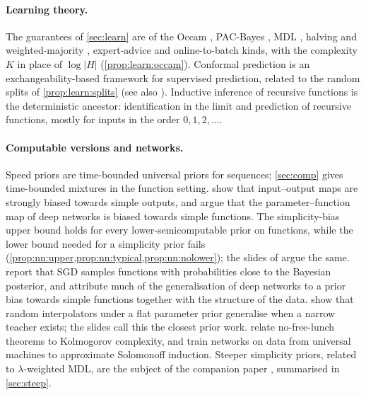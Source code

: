 \paragraph{Learning theory.} The guarantees of \cref{sec:learn} are of the Occam \citep{blumer1987occam}, PAC-Bayes \citep{mcallester1999some}, MDL \citep{barron1991minimum,grunwald2007minimum}, halving and weighted-majority \citep{littlestone1988learning,littlestone1994weighted}, expert-advice \citep{vovk1990aggregating,cesabianchi2006prediction} and online-to-batch \citep{littlestone1989online,cesabianchi2004generalization} kinds, with the complexity $K$ in place of $\log|H|$ (\cref{prop:learn:occam}). Conformal prediction \citep{vovk2005algorithmic} is an exchangeability-based framework for supervised prediction, related to the random splits of \cref{prop:learn:splits} (see also \citealp{vovk1992universal}). Inductive inference of recursive functions \citep{gold1967language,barzdin1972prediction,case1983comparison} is the deterministic ancestor: identification in the limit and prediction of recursive functions, mostly for inputs in the order $0,1,2,\dots$.

\paragraph{Computable versions and networks.}\label{rem:nn:literature}
Speed priors \citep{schmidhuber2002speed,filan2016loss} are time-bounded universal priors for sequences; \cref{sec:comp} gives time-bounded mixtures in the function setting. \citet{dingle2018input} show that input--output maps are strongly biased towards simple outputs, and \citet{valle2019deep} argue that the parameter--function map of deep networks is biased towards simple functions. The simplicity-bias upper bound holds for every lower-semicomputable prior on functions, while the lower bound needed for a simplicity prior fails (\cref{prop:nn:upper,prop:nn:typical,prop:nn:nolower}); the slides of \citet{vaintrobhanni2026nnbayes} argue the same. \citet{mingard2021sgd} report that SGD samples functions with probabilities close to the Bayesian posterior, and \citet{mingard2025deep} attribute much of the generalisation of deep networks to a prior bias towards simple functions together with the structure of the data. \citet{buzaglo2024} show that random interpolators under a flat parameter prior generalise when a narrow teacher exists; the slides call this the closest prior work. \citet{goldblum2023no} relate no-free-lunch theorems to Kolmogorov complexity, and \citet{grau2024learning} train networks on data from universal machines to approximate Solomonoff induction. Steeper simplicity priors, related to $\lambda$-weighted MDL, are the subject of the companion paper \citep{claudeSFI2026steeper}, summarised in \cref{sec:steep}.

